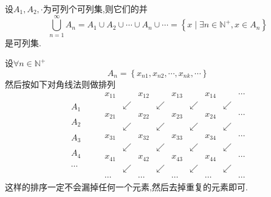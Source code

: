 \begin{formal}
\begin{theorem}[可列个可列集之并]\label{thm:可列个可列集之并}
    设$A_1,A_2,\cdot$为可列个可列集,则它们的并\[
    \bigcup_{n=1}^{\infty}A_n=A_1\cup A_2\cup \cdots \cup A_n\cup \cdots=\left\{
        x\mid \exists n\in \mathbb{N}^+,x\in A_n
    \right\}
    \]是可列集.
\end{theorem}
\begin{Proof}
    设$\forall n\in \mathbb{N}^+$\[
    A_n=\left\{
        x_{n1},x_{n2},\cdots,x_{nk},\cdots
    \right\}
    \]然后按如下对角线法则做排列\[
    \begin{matrix}
        A_1\\
        \\
        A_2\\
        \\
        A_3\\
        \\
        A_4\\
        \\
        \cdots
    \end{matrix}\qquad
    \begin{matrix}
        x_{11}&&x_{12}&&x_{13}&&x_{14}&&\cdots\\
        &\swarrow &&\swarrow &&\swarrow &&\swarrow &\\
        x_{21}&&x_{22}&&x_{23}&&x_{24}&&\cdots\\
        &\swarrow &&\swarrow &&\swarrow &&\swarrow &\\
        x_{31}&&x_{32}&&x_{33}&&x_{34}&&\cdots\\
        &\swarrow &&\swarrow &&\swarrow &&\swarrow &\\
        x_{41}&&x_{42}&&x_{43}&&x_{44}&&\cdots\\
        &\swarrow &&\swarrow &&\swarrow &&\swarrow &\\
        \cdots&&\cdots&&\cdots&&\cdots&&\cdots
    \end{matrix}
    \]这样的排序一定不会漏掉任何一个元素,然后去掉重复的元素即可.
\end{Proof}
\end{formal}
